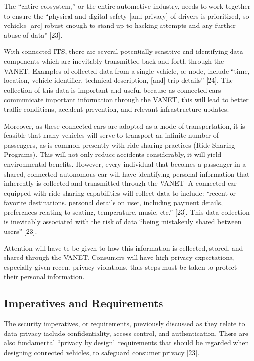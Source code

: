 \documentclass[conference,compsoc]{IEEEtran}
\begin{document}
The “entire ecosystem,” or the entire automotive industry, needs to work together to ensure the “physical and digital safety [and privacy] of drivers is prioritized, so vehicles [are] robust enough to stand up to hacking attempts and any further abuse of data” [23].

With connected ITS, there are several potentially sensitive and identifying data components which are inevitably transmitted back and forth through the VANET. Examples of collected data from a single vehicle, or node, include “time, location, vehicle identifier, technical description, [and] trip details” [24]. The collection of this data is important and useful because as connected cars communicate important information through the VANET, this will lead to better traffic conditions, accident prevention, and relevant infrastructure updates.

Moreover, as these connected cars are adopted as a mode of transportation, it is feasible that many vehicles will serve to transport an infinite number of passengers, as is common presently with ride sharing practices (Ride Sharing Programs). This will not only reduce accidents considerably, it will yield environmental benefits. However, every individual that becomes a passenger in a shared, connected autonomous car will have identifying personal information that inherently is collected and transmitted through the VANET. A connected car equipped with ride-sharing capabilities will collect data to include: “recent or favorite destinations, personal details on user, including payment details, preferences relating to seating, temperature, music, etc.” [23]. This data collection is inevitably associated with the risk of data “being mistakenly shared between users” [23].

Attention will have to be given to how this information is collected, stored, and shared through the VANET. Consumers will have high privacy expectations, especially given recent privacy violations, thus steps must be taken to protect their personal information. 

\subsection{Imperatives and Requirements}
The security imperatives, or requirements, previously discussed as they relate to data privacy include confidentiality, access control, and authentication. There are also fundamental “privacy by design” requirements that should be regarded when designing connected vehicles, to safeguard consumer privacy [23]. 
\end{document}

